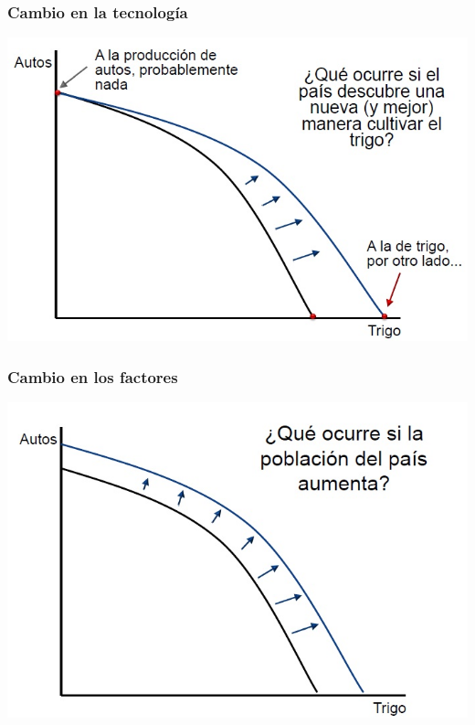 \documentclass{beamer}
\begin{document}
\begin{frame}
\frametitle{Cambio en la tecnología}
\begin{center}
    \includegraphics[scale=0.6]{../Tema_11.7_cambiotecnologico.jpg}
\end{center}
\end{frame}

\begin{frame}
\frametitle{Cambio en los factores}
\begin{center}
    \includegraphics[scale=0.55]{../Tema_11.8_cambioenlosfactores.jpg}
\end{center}
\end{frame}
\end{document}

